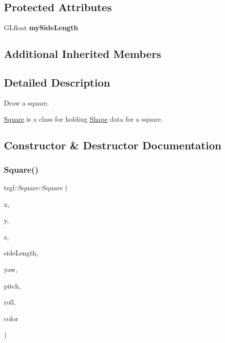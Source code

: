 \subsection*{Protected Attributes}
\begin{DoxyCompactItemize}
\item 
\mbox{\label{classtsgl_1_1_square_a501911f1f20111d504f756b437bccdaf}} 
G\+Lfloat {\bfseries my\+Side\+Length}
\end{DoxyCompactItemize}
\subsection*{Additional Inherited Members}


\subsection{Detailed Description}
Draw a square. 

\hyperlink{classtsgl_1_1_square}{Square} is a class for holding \hyperlink{classtsgl_1_1_shape}{Shape} data for a square. 

\subsection{Constructor \& Destructor Documentation}
\mbox{\label{classtsgl_1_1_square_a1279be7f6ddfc10491c6d77ff9cc18bf}} 
\subsubsection{\texorpdfstring{Square()}{Square()}\hspace{0.1cm}{\footnotesize\ttfamily [1/2]}}
{\footnotesize\ttfamily tsgl\+::\+Square\+::\+Square (\begin{DoxyParamCaption}\item[{float}]{x,  }\item[{float}]{y,  }\item[{float}]{z,  }\item[{G\+Lfloat}]{side\+Length,  }\item[{float}]{yaw,  }\item[{float}]{pitch,  }\item[{float}]{roll,  }\item[{\hyperlink{structtsgl_1_1_color_float}{Color\+Float}}]{color }\end{DoxyParamCaption})}



